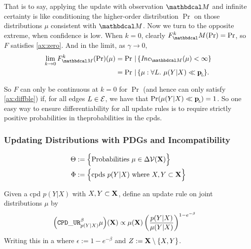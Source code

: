 \documentclass{article}
\begin{document}
That is to say, applying the update with observation $\dg M$ and infinite certainty is like conditioning the higher-order distribution $\Pr$ on those distributions $\mu$ consistent with $\dg M$.
Now we turn to the opposite extreme, when confidence is low. When $k=0$, clearly $F^k_\dg M(\Pr) = \Pr$, so $F$ satisfies \cref{ax:zero}. And in the limit, as $\gamma \to 0$,
\begin{align*}
    \lim_{k \to 0} F_{\dg M}^k(\Pr)(\mu) &= \Pr \,|\, \{ \Inc_{\dg M}(\mu) < \infty \} \\
        &= \Pr \,|\, \{\mu : \forall L.~\mu(Y|X) \ll \bp \}.
\end{align*}

So $F$ can only be continuous at $k=0$ for $\Pr$ (and hence can only satisfy \cref{ax:diffble}) if, for all edges $L \in \mathcal E$, we have that $\Pr(\mu(Y|X) \ll \mathbf{p}_{\!_{L}\!}) = 1$.
So one easy way to ensure differentiability for all update rules is to require strictly positive probabilities in theprobabilities in the cpds.



\subsubsection{Updating Distributions with PDGs and Incompatibility}
\def\tauur{\mathtt{CPD\_UR}}

\begin{align*}
    \Theta &:=
        \Big\{
        \text{Probabilities}~ \mu \in \Delta \mathcal V(\mathbf{X})
        \Big\} \\
    \Phi &:= \Big\{ \text{cpds}~ p(Y|X)
        \text{ where }  X, Y \subset \mathbf{X} \Big\}
\end{align*}

Given a cpd $p(Y|X)$ with $X,Y \subset \mathbf{X}$,
define an update rule on joint distributions $\mu$ by
\begin{align*}
    \Big(\tauur_{p(Y|X)}^\beta \mu\Big) (\mat X) &\propto
        \mu(\mat X) \left(\frac{p(Y|X)}{\mu(Y|X)}\right)^{1 - e^{-\beta}}
\end{align*}
Writing this in a
where $\epsilon := 1-e^{-\beta}$ and $Z := \mathbf{X} \setminus \{X,Y\}$.
\end{document}
